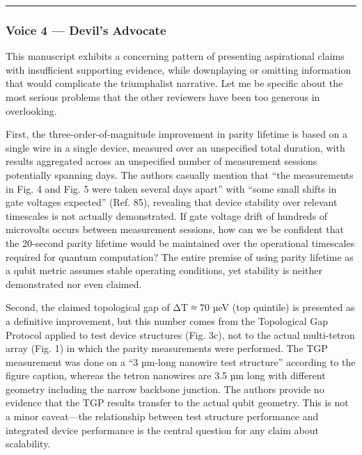 \documentclass[10pt,letterpaper]{article}
\begin{document}
\begin{center}\rule{0.5\linewidth}{0.5pt}\end{center}

\hypertarget{voice-4-devils-advocate}{%
\subsubsection{Voice 4 --- Devil's Advocate}\label{voice-4-devils-advocate}}

This manuscript exhibits a concerning pattern of presenting aspirational claims with insufficient supporting evidence, while downplaying or omitting information that would complicate the triumphalist narrative. Let me be specific about the most serious problems that the other reviewers have been too generous in overlooking.

First, the three-order-of-magnitude improvement in parity lifetime is based on a single wire in a single device, measured over an unspecified total duration, with results aggregated across an unspecified number of measurement sessions potentially spanning days. The authors casually mention that ``the measurements in Fig. 4 and Fig. 5 were taken several days apart'' with ``some small shifts in gate voltages expected'' (Ref. 85), revealing that device stability over relevant timescales is not actually demonstrated. If gate voltage drift of hundreds of microvolts occurs between measurement sessions, how can we be confident that the 20-second parity lifetime would be maintained over the operational timescales required for quantum computation? The entire premise of using parity lifetime as a qubit metric assumes stable operating conditions, yet stability is neither demonstrated nor even claimed.

Second, the claimed topological gap of ΔT ≈ 70 µeV (top quintile) is presented as a definitive improvement, but this number comes from the Topological Gap Protocol applied to test device structures (Fig. 3c), not to the actual multi-tetron array (Fig. 1) in which the parity measurements were performed. The TGP measurement was done on a ``3 µm-long nanowire test structure'' according to the figure caption, whereas the tetron nanowires are 3.5 µm long with different geometry including the narrow backbone junction. The authors provide no evidence that the TGP results transfer to the actual qubit geometry. This is not a minor caveat---the relationship between test structure performance and integrated device performance is the central question for any claim about scalability.
\end{document}
